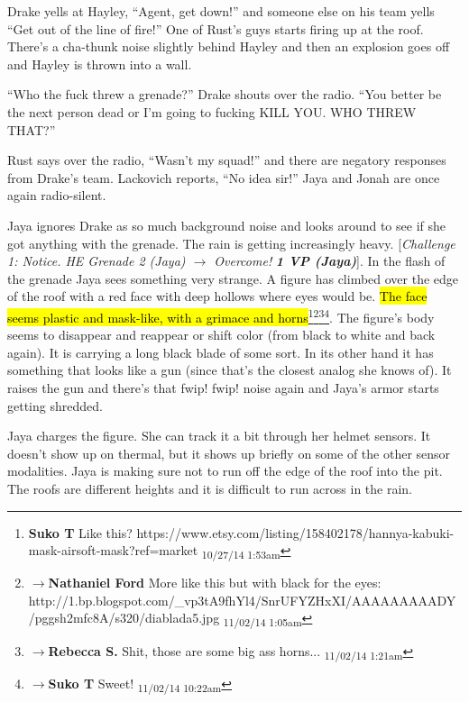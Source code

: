 Drake yells at Hayley, ``Agent, get down!''  and someone else on his team yells ``Get out of the line of fire!''  One of Rust's guys starts firing up at the roof.  There's a cha-thunk noise slightly behind Hayley and then an explosion goes off and Hayley is thrown into a wall.



``Who the fuck threw a grenade?'' Drake shouts over the radio.  ``You better be the next person dead or I'm going to fucking KILL YOU.  WHO THREW THAT?''

Rust says over the radio, ``Wasn't my squad!'' and there are negatory responses from Drake's team.  Lackovich reports, ``No idea sir!''  Jaya and Jonah are once again radio-silent.



Jaya ignores Drake as so much background noise and looks around to see if she got anything with the grenade.  The rain is getting increasingly heavy.  {[}\textit{Challenge 1: Notice.  HE Grenade 2 (Jaya) $\rightarrow$ Overcome! }\textit{\textbf{1 VP (Jaya)}}{]}.  In the flash of the grenade Jaya sees something very strange.  A figure has climbed over the edge of the roof with a red face with deep hollows where eyes would be. \hl{The face seems plastic and mask-like, with a grimace and horns}\footnote{\textbf{Suko T }Like this?
https://www.etsy.com/listing/158402178/hannya-kabuki-mask-airsoft-mask?ref=market \textsubscript{10/27/14 1:53am}}\footnote{$\rightarrow$\textbf{Nathaniel Ford }More like this but with black for the eyes:
http://1.bp.blogspot.com/\_vp3tA9fhYl4/SnrUFYZHxXI/AAAAAAAAADY/pggsh2mfc8A/s320/diablada5.jpg \textsubscript{11/02/14 1:05am}}\footnote{$\rightarrow$\textbf{Rebecca S. }Shit, those are some big ass horns... \textsubscript{11/02/14 1:21am}}\footnote{$\rightarrow$\textbf{Suko T }Sweet! \textsubscript{11/02/14 10:22am}}.  The figure's body seems to disappear and reappear or shift color (from black to white and back again).  It is carrying a long black blade of some sort.  In its other hand it has something that looks like a gun (since that's the closest analog she knows of).  It raises the gun and there's that fwip! fwip! noise again and Jaya's armor starts getting shredded.



Jaya charges the figure.  She can track it a bit through her helmet sensors.  It doesn't show up on thermal, but it shows up briefly on some of the other sensor modalities.  Jaya is making sure not to run off the edge of the roof into the pit. The roofs are different heights and it is difficult to run across in the rain.



